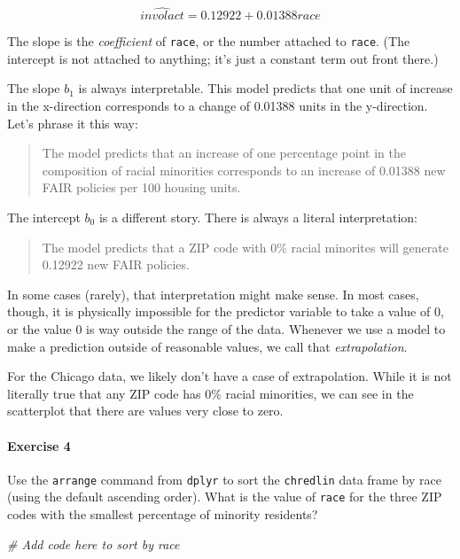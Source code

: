 \documentclass[
]{book}
\newenvironment{Shaded}{\begin{snugshade}}{\end{snugshade}}
\newcommand{\CommentTok}[1]{\textcolor[rgb]{0.56,0.35,0.01}{\textit{#1}}}
\begin{document}
\[
\widehat{involact} = 0.12922 + 0.01388 race
\]

The slope is the \emph{coefficient} of \texttt{race}, or the number attached to \texttt{race}. (The intercept is not attached to anything; it's just a constant term out front there.)

The slope \(b_{1}\) is always interpretable. This model predicts that one unit of increase in the x-direction corresponds to a change of 0.01388 units in the y-direction. Let's phrase it this way:

\begin{quote}
The model predicts that an increase of one percentage point in the composition of racial minorities corresponds to an increase of 0.01388 new FAIR policies per 100 housing units.
\end{quote}

The intercept \(b_{0}\) is a different story. There is always a literal interpretation:

\begin{quote}
The model predicts that a ZIP code with 0\% racial minorites will generate 0.12922 new FAIR policies.
\end{quote}

In some cases (rarely), that interpretation might make sense. In most cases, though, it is physically impossible for the predictor variable to take a value of 0, or the value 0 is way outside the range of the data. Whenever we use a model to make a prediction outside of reasonable values, we call that \emph{extrapolation}.

For the Chicago data, we likely don't have a case of extrapolation. While it is not literally true that any ZIP code has 0\% racial minorities, we can see in the scatterplot that there are values very close to zero.

\hypertarget{exercise-4-3}{%
\paragraph*{Exercise 4}\label{exercise-4-3}}

Use the \texttt{arrange} command from \texttt{dplyr} to sort the \texttt{chredlin} data frame by race (using the default ascending order). What is the value of \texttt{race} for the three ZIP codes with the smallest percentage of minority residents?

\begin{Shaded}
\begin{Highlighting}[]
\CommentTok{\# Add code here to sort by race}
\end{Highlighting}
\end{Shaded}
\end{document}

